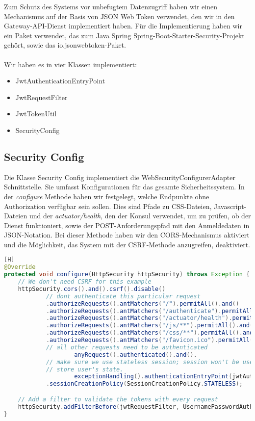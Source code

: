 Zum Schutz des Systems vor unbefugtem Datenzugriff haben wir einen Mechanismus auf der Basis von JSON Web Token verwendet, den wir in den Gateway-API-Dienst implementiert haben. Für die Implementierung haben wir ein Paket verwendet, das zum Java Spring Spring-Boot-Starter-Security-Projekt gehört, sowie das io.jsonwebtoken-Paket. \\ \\
Wir haben es in vier Klassen implementiert:
\begin{itemize}
	\item JwtAuthenticationEntryPoint
	\item JwtRequestFilter
	\item JwtTokenUtil
	\item SecurityConfig
\end{itemize}

\subsection{Security Config}
Die Klasse Security Config implementiert die WebSecurityConfigurerAdapter Schnittstelle. Sie umfasst Konfigurationen für das gesamte Sicherheitssystem.
In der \textit{configure} Methode haben wir festgelegt, welche Endpunkte ohne Authorization verfügbar sein sollen. Dies sind Pfade zu CSS-Dateien, Javascript-Dateien und der \textit{actuator/health}, den der Konsul verwendet, um zu prüfen, ob der Dienst funktioniert, sowie der POST-Anforderungspfad mit den Anmeldedaten in JSON-Notation. Bei dieser Methode haben wir den CORS-Mechanismus aktiviert und die Möglichkeit, das System mit der CSRF-Methode anzugreifen, deaktiviert.

\begin{lstlisting}[language=JAVA,caption=SecurityConfig.java][H]
@Override
protected void configure(HttpSecurity httpSecurity) throws Exception {
    // We don't need CSRF for this example
    httpSecurity.cors().and().csrf().disable()
            // dont authenticate this particular request
            .authorizeRequests().antMatchers("/").permitAll().and()
            .authorizeRequests().antMatchers("/authenticate").permitAll().and()
            .authorizeRequests().antMatchers("/actuator/health").permitAll().and()
            .authorizeRequests().antMatchers("/js/**").permitAll().and()
            .authorizeRequests().antMatchers("/css/**").permitAll().and()
            .authorizeRequests().antMatchers("/favicon.ico").permitAll().
            // all other requests need to be authenticated
                    anyRequest().authenticated().and().
            // make sure we use stateless session; session won't be used to
            // store user's state.
                    exceptionHandling().authenticationEntryPoint(jwtAuthenticationEntryPoint).and().sessionManagement()
            .sessionCreationPolicy(SessionCreationPolicy.STATELESS);

    // Add a filter to validate the tokens with every request
    httpSecurity.addFilterBefore(jwtRequestFilter, UsernamePasswordAuthenticationFilter.class);
}
\end{lstlisting}

